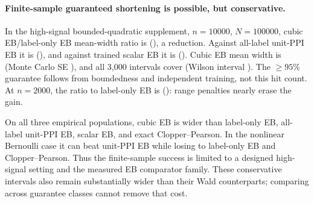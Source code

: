 \paragraph{Finite-sample guaranteed shortening is possible, but conservative.}
In the high-signal bounded-quadratic supplement, $n=10000$, $N=100000$, cubic EB/label-only EB mean-width ratio is \BoundedRatio{} (\BoundedRatioCI{}), a \BoundedReduction{} reduction. Against all-label unit-PPI EB it is \BoundedUnitRatio{} (\BoundedUnitRatioCI{}), and against trained scalar EB it is \BoundedScalarRatio{} (\BoundedScalarRatioCI{}). Cubic EB mean width is \BoundedWidth{} (Monte Carlo SE \BoundedWidthSE{}), and all 3,000 intervals cover (Wilson interval \BoundedCoverageCI{}). The $\ge95\%$ guarantee follows from boundedness and independent training, not this hit count. At $n=2000$, the ratio to label-only EB is \BoundedSmallRatio{} (\BoundedSmallRatioCI{}): range penalties nearly erase the gain.

On all three empirical populations, cubic EB is wider than label-only EB, all-label unit-PPI EB, scalar EB, and exact Clopper--Pearson. In the nonlinear Bernoulli case it can beat unit-PPI EB while losing to label-only EB and Clopper--Pearson. Thus the finite-sample success is limited to a designed high-signal setting and the measured EB comparator family. These conservative intervals also remain substantially wider than their Wald counterparts; comparing across guarantee classes cannot remove that cost.
